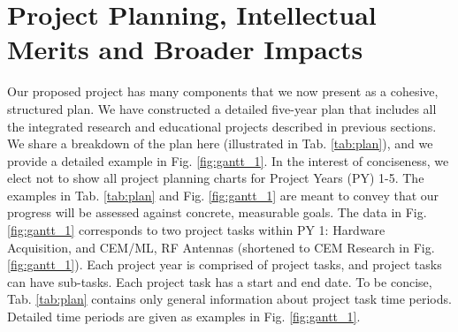 \documentclass[11pt]{amsart}
\begin{document}
\section{Project Planning, Intellectual Merits and Broader Impacts}
\label{sec:time_im}

Our proposed project has many components that we now present as a cohesive, structured plan.  We have constructed a detailed five-year plan that includes all the integrated research and educational projects described in previous sections.  We share a breakdown of the plan here (illustrated in Tab. \ref{tab:plan}), and we provide a detailed example in Fig. \ref{fig:gantt_1}.  In the interest of conciseness, we elect not to show all project planning charts for Project Years (PY) 1-5.  The examples in Tab. \ref{tab:plan} and Fig. \ref{fig:gantt_1} are meant to convey that our progress will be assessed against concrete, measurable goals.  The data in Fig. \ref{fig:gantt_1} corresponds to two project tasks within PY 1: Hardware Acquisition, and CEM/ML, RF Antennas (shortened to CEM Research in Fig. \ref{fig:gantt_1}).  Each project year is comprised of project tasks, and project tasks can have sub-tasks.  Each project task has a start and end date.  To be concise, Tab. \ref{tab:plan} contains only general information about project task time periods.  Detailed time periods are given as examples in Fig. \ref{fig:gantt_1}.
\end{document}
